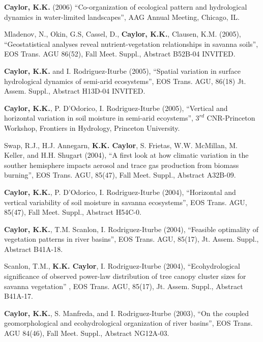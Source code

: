\documentclass[10pt]{article}
\begin{document}
\begin{etaremune}
\item \textbf{Caylor, K.K.} (2006) ``Co-organization of ecological pattern and hydrological dynamics in water-limited landscapes'', AAG Annual Meeting, Chicago, IL.

\item Mladenov, N., Okin, G.S, Cassel, D., \textbf{Caylor, K.K.}, Clausen, K.M.  (2005), ``Geostatistical analyses reveal nutrient-vegetation relationships in savanna soils'', EOS Trans. AGU 86(52), Fall Meet. Suppl., Abstract B52B-04 INVITED.

\item \textbf{Caylor, K.K.} and I. Rodriguez-Iturbe (2005), ``Spatial variation in surface hydrological dynamics of semi-arid ecosystems'', EOS Trans. AGU, 86(18) Jt. Assem. Suppl., Abstract H13D-04 INVITED.

\item \textbf{Caylor, K.K.}, P. D'Odorico, I. Rodriguez-Iturbe (2005), ``Vertical and horizontal variation in soil moisture in semi-arid ecoystems'', $3^{rd}$ CNR-Princeton Workshop, Frontiers in Hydrology, Princeton University. 

\item Swap, R.J., H.J. Annegarn, \textbf{K.K. Caylor}, S. Frietas, W.W. McMillan, M. Keller, and H.H. Shugart (2004), ``A first look at how climatic variation in the souther hemisphere impacts aerosol and trace gas production from biomass burning'', EOS Trans. AGU, 85(47), Fall Meet. Suppl., Abstract A32B-09.

\item \textbf{Caylor, K.K.}, P. D'Odorico, I. Rodriguez-Iturbe (2004), ``Horizontal and vertical variability of soil moisture in savanna ecosystems'', EOS Trans. AGU, 85(47), Fall Meet. Suppl., Abstract H54C-0.

\item \textbf{Caylor, K.K.}, T.M. Scanlon, I. Rodriguez-Iturbe (2004), ``Feasible optimality of vegetation patterns in river basins'', EOS Trans. AGU, 85(17), Jt. Assem. Suppl., Abstract B41A-18.

\item Scanlon, T.M., \textbf{K.K. Caylor}, I. Rodriguez-Iturbe (2004), ``Ecohydrological significance of observed power-law distribution of tree canopy cluster sizes for savanna vegetation'' , EOS Trans. AGU, 85(17), Jt. Assem. Suppl., Abstract B41A-17.

\item \textbf{Caylor, K.K.}, S. Manfreda, and I. Rodriguez-Iturbe (2003), ``On the coupled geomorphological and ecohydrological organization of river basins'', EOS Trans. AGU 84(46), Fall Meet. Suppl., Abstract NG12A-03.


\end{etaremune}
\end{document}
